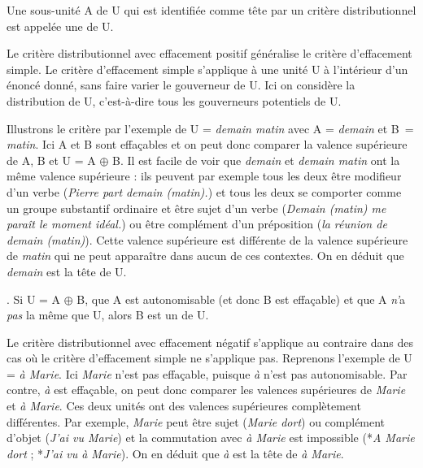 {Une sous-unité A de U qui est identifiée comme tête par un critère distributionnel est appelée une  de U.}

Le critère distributionnel avec effacement positif généralise le critère d’effacement simple. Le critère d’effacement simple s’applique à une unité U à l’intérieur d’un énoncé donné, sans faire varier le gouverneur de U. Ici on considère la distribution de U, c’est-à-dire tous les gouverneurs potentiels de U.

Illustrons le critère par l’exemple de U = \textit{demain matin} avec A = \textit{demain} et B~= \textit{matin}. Ici A et B sont effaçables et on peut donc comparer la valence supérieure de A, B et U = A ${\oplus}$ B. Il est facile de voir que \textit{demain} et \textit{demain matin} ont la même valence supérieure : ils peuvent par exemple tous les deux être modifieur d'un verbe (\textit{Pierre part demain (matin).}) et tous les deux se comporter comme un groupe substantif ordinaire et être sujet d'un verbe (\textit{Demain (matin) me paraît le moment idéal.}) ou être complément d'un préposition (\textit{la réunion de demain (matin)}). Cette valence supérieure est différente de la valence supérieure de \textit{matin} qui ne peut apparaître dans aucun de ces contextes. On en déduit que \textit{demain} est la tête de U.

{. Si U = A ${\oplus}$ B, que A est autonomisable (et donc B est effaçable) et que A \textit{n'}a \textit{pas} la même  que U, alors B est un  de U.}

Le critère distributionnel avec effacement négatif s’applique au contraire dans des cas où le critère d’effacement simple ne s’applique pas. Reprenons l’exemple de U = \textit{à Marie}. Ici \textit{Marie} n’est pas effaçable, puisque \textit{à} n’est pas autonomisable. Par contre, \textit{à} est effaçable, on peut donc comparer les valences supérieures de \textit{Marie} et \textit{à Marie}. Ces deux unités ont des valences supérieures complètement différentes. Par exemple, \textit{Marie} peut être sujet (\textit{Marie dort}) ou complément d’objet (\textit{J’ai vu Marie}) et la commutation avec \textit{à Marie} est impossible (*\textit{A Marie dort} ; *\textit{J’ai vu à Marie}). On en déduit que \textit{à} est la tête de \textit{à Marie}.

